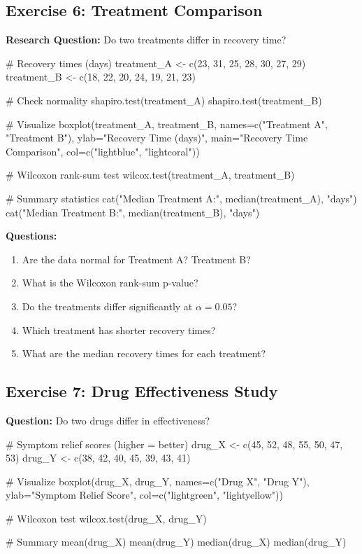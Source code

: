 \documentclass[11pt]{article}
\begin{document}
\subsection{Exercise 6: Treatment Comparison}

\textbf{Research Question:} Do two treatments differ in recovery time?

\begin{rcode}
# Recovery times (days)
treatment_A <- c(23, 31, 25, 28, 30, 27, 29)
treatment_B <- c(18, 22, 20, 24, 19, 21, 23)

# Check normality
shapiro.test(treatment_A)
shapiro.test(treatment_B)

# Visualize
boxplot(treatment_A, treatment_B,
        names=c("Treatment A", "Treatment B"),
        ylab="Recovery Time (days)",
        main="Recovery Time Comparison",
        col=c("lightblue", "lightcoral"))

# Wilcoxon rank-sum test
wilcox.test(treatment_A, treatment_B)

# Summary statistics
cat("Median Treatment A:", median(treatment_A), "days\n")
cat("Median Treatment B:", median(treatment_B), "days\n")
\end{rcode}

\textbf{Questions:}
\begin{enumerate}
\item Are the data normal for Treatment A? Treatment B?
\item What is the Wilcoxon rank-sum p-value?
\item Do the treatments differ significantly at $\alpha = 0.05$?
\item Which treatment has shorter recovery times?
\item What are the median recovery times for each treatment?
\end{enumerate}

\vspace{1cm}

\subsection{Exercise 7: Drug Effectiveness Study}

\textbf{Question:} Do two drugs differ in effectiveness?

\begin{rcode}
# Symptom relief scores (higher = better)
drug_X <- c(45, 52, 48, 55, 50, 47, 53)
drug_Y <- c(38, 42, 40, 45, 39, 43, 41)

# Visualize
boxplot(drug_X, drug_Y,
        names=c("Drug X", "Drug Y"),
        ylab="Symptom Relief Score",
        col=c("lightgreen", "lightyellow"))

# Wilcoxon test
wilcox.test(drug_X, drug_Y)

# Summary
mean(drug_X)
mean(drug_Y)
median(drug_X)
median(drug_Y)
\end{rcode}
\end{document}

